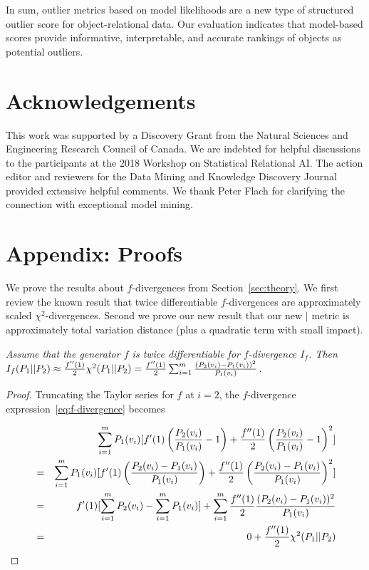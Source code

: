 {								
In sum, outlier metrics based on model likelihoods are a new type of structured outlier score for object-relational data.  Our evaluation indicates that  model-based scores provide informative, interpretable, and accurate rankings of objects as potential outliers. 
								
\section*{Acknowledgements} This work was supported by a Discovery Grant from the Natural Sciences and Engineering Research Council of Canada. We are indebted for helpful discussions to the participants at the 2018 Workshop on Statistical Relational AI. The action editor and reviewers for the Data Mining and Knowledge Discovery Journal provided extensive helpful comments. We thank Peter Flach for clarifying the connection with exceptional model mining.

\section*{Appendix: Proofs} \label{sec:proofs}

We prove the results about $f$-divergences from Section~\ref{sec:theory}. We first review the known result that twice differentiable $f$-divergences are approximately scaled $\chi^{2}$-divergences. Second we prove our new result that our new $\mid$ metric is approximately total variation distance (plus a quadratic term with small impact).  


{\em 
Assume that the generator $f$ is twice differentiable for $f$-divergence $I_{f}$. Then $I_{f}(P_{1}||P_{2}) \approx \frac{f''(1)}{2} \chi^{2}(P_{1}||P_{2}) = \frac{f''(1)}{2} 
\sum_{i=1}^{m}  \frac{(P_{2}(v_{i})-P_{1}(v_{i}))^{2}}
 {P_{1}(v_{i})}$. 
}
\begin{proof}

Truncating the Taylor series for $f$ at $i=2$, the $f$-divergence expression~\ref{eq:f-divergence} becomes 

\begin{eqnarray*}
& & \sum_{i=1}^{m} P_{1}(v_{i}) [f'(1) \left(\frac{P_{2}(v_{i})}{P_{1}(v_{i})}-1\right) + \frac{f''(1)}{2} \left(\frac{P_{2}(v_{i})}{P_{1}(v_{i})}-1\right)^{2}]  \\
& = &\sum_{i=1}^{m} P_{1}(v_{i}) [f'(1) \left(\frac{P_{2}(v_{i})-P_{1}(v_{i})}{P_{1}(v_{i})}\right) + \frac{f''(1)}{2} \left(\frac{P_{2}(v_{i})-P_{1}(v_{i})}{P_{1}(v_{i})}\right)^{2}] \\
 & = & f'(1) [\sum_{i=1}^{m} P_{2}(v_{i}) - \sum_{i=1}^{m} P_{1}(v_{i})] + \sum_{i=1}^{m} \frac{f''(1)}{2} 
 \frac{(P_{2}(v_{i})-P_{1}(v_{i}))^{2}}
 {P_{1}(v_{i})} \\
& = &   0 + \frac{f''(1)}{2} \chi^{2}(P_{1}||P_{2})
\end{eqnarray*}


\end{proof}}
